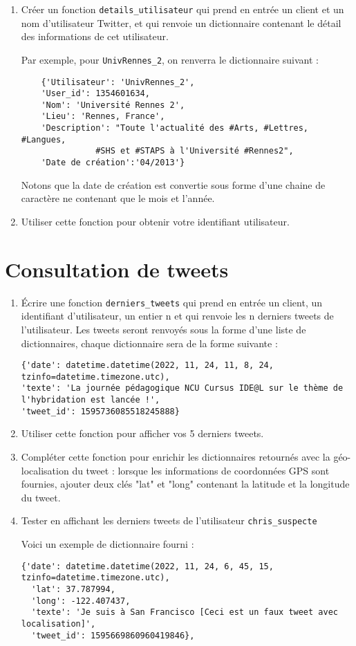 \documentclass[11pt,a4paper]{article}
\begin{document}
\begin{enumerate}

    \item Créer un fonction \verb+details_utilisateur+ qui prend en entrée un client et un nom d'utilisateur Twitter, et qui renvoie un dictionnaire contenant le détail des informations de cet utilisateur. 
    
    Par exemple, pour \verb+UnivRennes_2+, on renverra le dictionnaire suivant : 
    \begin{verbatim}
    {'Utilisateur': 'UnivRennes_2', 
    'User_id': 1354601634, 
    'Nom': 'Université Rennes 2', 
    'Lieu': 'Rennes, France', 
    'Description': "Toute l'actualité des #Arts, #Lettres, #Langues,
               #SHS et #STAPS à l'Université #Rennes2", 
    'Date de création':'04/2013'}
    \end{verbatim}
    Notons que la date de création est convertie sous forme d'une chaine de caractère ne contenant que le mois et l'année.

    \item Utiliser cette fonction pour obtenir votre identifiant utilisateur.

\end{enumerate}


\section{Consultation de tweets}


\begin{enumerate}
\item Écrire une fonction \verb+derniers_tweets+ qui prend en entrée un client, un identifiant d'utilisateur, un entier n et qui renvoie les n derniers tweets de l'utilisateur. 
Les tweets seront renvoyés sous la forme d'une liste de dictionnaires, chaque dictionnaire sera de la forme suivante : 
\begin{verbatim}
{'date': datetime.datetime(2022, 11, 24, 11, 8, 24, tzinfo=datetime.timezone.utc),
'texte': 'La journée pédagogique NCU Cursus IDE@L sur le thème de l'hybridation est lancée !',
'tweet_id': 1595736085518245888}
\end{verbatim}
\item Utiliser cette fonction pour afficher vos 5 derniers tweets.

\item Compléter cette fonction pour enrichir les dictionnaires retournés avec la géo-localisation du tweet : lorsque les informations de coordonnées GPS sont fournies, ajouter deux clés "lat" et "long" contenant la latitude et la longitude du tweet.
\item Tester en affichant les derniers tweets de l'utilisateur \verb+chris_suspecte+

Voici un exemple de dictionnaire fourni : 
\begin{verbatim}
{'date': datetime.datetime(2022, 11, 24, 6, 45, 15, tzinfo=datetime.timezone.utc),
  'lat': 37.787994,
  'long': -122.407437,
  'texte': 'Je suis à San Francisco [Ceci est un faux tweet avec localisation]',
  'tweet_id': 1595669860960419846},
\end{verbatim}

\end{enumerate}
\end{document}
